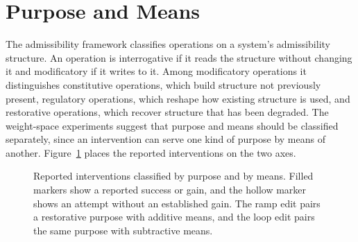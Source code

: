 \documentclass[11pt]{article}
\begin{document}
\section{Purpose and Means}

The admissibility framework classifies operations on a system's admissibility structure. An operation is interrogative if it reads the structure without changing it and modificatory if it writes to it. Among modificatory operations it distinguishes constitutive operations, which build structure not previously present, regulatory operations, which reshape how existing structure is used, and restorative operations, which recover structure that has been degraded. The weight-space experiments suggest that purpose and means should be classified separately, since an intervention can serve one kind of purpose by means of another. Figure~\ref{fig:purposemeans} places the reported interventions on the two axes.

\begin{figure}[htbp]
\centering
{}
\caption{Reported interventions classified by purpose and by means. Filled markers show a reported success or gain, and the hollow marker shows an attempt without an established gain. The ramp edit pairs a restorative purpose with additive means, and the loop edit pairs the same purpose with subtractive means.}
\label{fig:purposemeans}
\end{figure}
\end{document}
